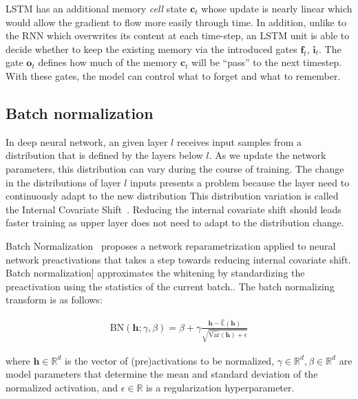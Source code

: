 \documentclass{article} %
\newcommand{\vect}[1]{\mathbf{#1}}
\newcommand{\reals}{\mathbb{R}}
\begin{document}
LSTM has an  additional memory \emph{cell} state $\vect{c}_t$ whose update is nearly linear which would
allow the gradient to flow more easily through time.
In addition, unlike to the RNN which overwrites its content at each time-step,
an LSTM unit is able to decide whether to keep the existing memory via the introduced gates $\vect{f}_t$, $\vect{i}_t$.
The gate $\vect{o}_t$ defines how much of the memory $\vect{c}_t$ will be ``pass'' to the next timestep.
With these gates, the model can control what to forget and what to remember.




\subsection{Batch normalization}

In deep neural network, an given layer $l$ receives input samples from a distribution that is defined by the layers below $l$.
As we update the network parameters, this distribution can vary during the course of training.
The change in the distributions of layer $l$ inputs presents a problem because the layer need to continuously adapt to the new distribution
This distribution variation is called the Internal Covariate Shift~\cite{shimodaira2000improving}.
Reducing the internal covariate shift should leads  faster training as upper layer does not need to adapt to the distribution change.

Batch Normalization~\cite{batchnorm} proposes a network reparametrization applied to neural network preactivations that takes a step towards reducing
internal covariate shift. Batch normalization] approximates the
whitening by standardizing the preactivation using the statistics of the current batch..
The batch normalizing transform is as follows:

\begin{align}
\mathrm{BN}(\vect{h}; \gamma, \beta) =
  \beta + \gamma
  \frac{\vect{h} -   \widehat{\mathbb{E}}(\vect{h})}
       {       \sqrt{\widehat{\mathrm{Var }}(\vect{h}) + \epsilon}}
\end{align}

where $\vect{h} \in \reals^d$ is the vector of (pre)activations to be normalized, $\gamma \in \reals^d, \beta \in \reals^d$ are model parameters that determine the mean and standard deviation of the normalized activation, and $\epsilon \in \reals$ is a regularization hyperparameter.
\end{document}
